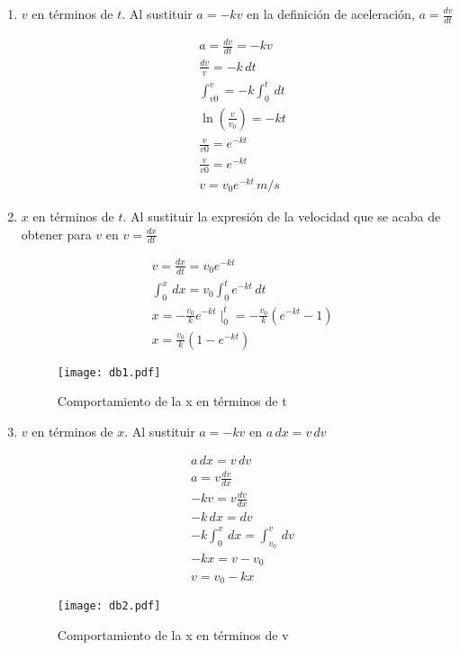 \begin{enumerate}
    \item $v$ en términos de $t$. Al sustituir $a=-kv$ en la definición de aceleración, $a=\frac{dv}{dt}$

    \begin{align*}
        &a=\frac{dv}{dt}=-kv\\
        &\frac{dv}{v}=-k\, dt\\
        &\int_{v0}^{v}=-k\int_0^t\, dt\\
        &\ln{\left(\frac{v}{v_0}\right)}=-kt\\
        &\frac{v}{v0}=e^{-kt}\\
        &\frac{v}{v0}=e^{-kt}\\
        &v=v_0e^{-kt}\,m/s
    \end{align*}

    \item $x$ en términos de $t$. Al sustituir la expresión de la velocidad que se acaba de obtener para $v$ en $v=\frac{dx}{dt}$

    \begin{align*}
        &v=\frac{dx}{dt}=v_0e^{-kt}\\
        &\int_0^x\,dx=v_0\int_0^te^{-kt}\, dt\\
        &x=-\frac{v_0}{k} e^{-kt}\mid_0^t=-\frac{v_0}{k}\left(e^{-kt}-1 \right)\\
        &x=\frac{v_0}{k}\left(1-e^{-kt}\right)
    \end{align*}
    
    \begin{figure}[h!]
        \texttt{[image: db1.pdf]}
        \caption{Comportamiento de la x en términos de t}
        \label{db1}
    \end{figure}
    
    \item $v$ en términos de $x$. Al sustituir $a=-kv$ en $a\,dx=v\,dv$

    \begin{align*}
        &a\,dx=v\,dv\\ 
        &a=v\frac{dv}{dx}\\
        &-kv=v\frac{dv}{dx}\\ 
        &-k\,dx=dv\\ 
        &-k\int_0^x\,dx=\int_{v_0}^v\,dv\\ 
        &-kx=v-v_0\\ 
        &v=v_0-kx
    \end{align*}
    \begin{figure}[h!]
        \texttt{[image: db2.pdf]}
        \caption{Comportamiento de la x en términos de v}
        \label{db2}
    \end{figure}
\end{enumerate}

